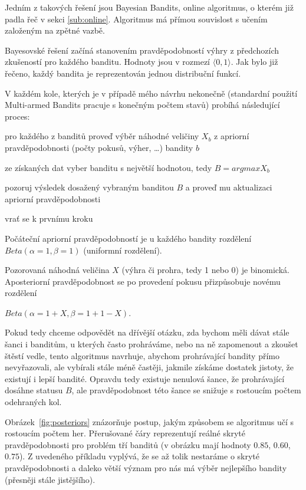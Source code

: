 \documentclass[thesis=M,czech]{FITthesis}[2014/05/07]
\begin{document}
Jedním z takových řešení jsou Bayesian Bandits, online algoritmus, o kterém již padla řeč v sekci \ref{sub:online}. Algoritmus má přímou souvislost s učením založeným na zpětné vazbě.

Bayesovské řešení začíná stanovením pravděpodobností výhry z předchozích zkušeností pro každého banditu. Hodnoty jsou v rozmezí $\langle0,1\rangle$. Jak bylo již řečeno, každý bandita je reprezentován jednou distribuční funkcí.

V každém kole, kterých je v případě mého návrhu nekonečně (standardní použití Multi-armed Bandits pracuje s konečným počtem stavů) probíhá následující proces:

\begin{description}
	\item pro každého z banditů proveď výběr náhodné veličiny $X_b$ z apriorní pravděpodobnosti (počty pokusů, výher, \ldots) bandity $b$
	\item ze získaných dat vyber banditu s největší hodnotou, tedy $B = argmax X_b$	
	\item pozoruj výsledek dosažený vybraným banditou $B$ a proveď mu aktualizaci apriorní pravděpodobnosti	
	\item vrať se k prvnímu kroku
\end{description}

Počáteční apriorní pravděpodobností je u každého bandity rozdělení ${Beta}(\alpha = 1, \beta = 1)$ (uniformní rozdělení).

Pozorovaná náhodná veličina $X$ (výhra či prohra, tedy 1 nebo 0) je binomická. Aposteriorní pravděpodobnost se po provedení pokusu přizpůsobuje novému rozdělení

\begin{center}
${Beta}(\alpha = 1 + X, \beta = 1 + 1 - X)$.
\end{center}

Pokud tedy chceme odpovědět na dřívější otázku, zda bychom měli dávat stále šanci i banditům, u kterých často prohráváme, nebo na ně zapomenout a zkoušet štěstí vedle, tento algoritmus navrhuje, abychom prohrávající bandity přímo nevyřazovali, ale vybírali stále méně častěji, jakmile získáme dostatek jistoty, že existují i lepší bandité. Opravdu tedy existuje nenulová šance, že prohrávající dosáhne statusu $B$, ale pravděpodobnost této šance se snižuje s rostoucím počtem odehraných kol. 


Obrázek~\ref{fig:posteriors} znázorňuje postup, jakým způsobem se algoritmus učí s rostoucím počtem her. Přerušované čáry reprezentují reálné skryté pravděpodobnosti pro problém tří banditů (v obrázku mají hodnoty $0.85$, $0.60$, $0.75$). Z uvedeného příkladu vyplývá, že se až tolik nestaráme o skryté pravděpodobnosti a daleko větší význam pro nás má výběr nejlepšího bandity (přesněji stále jistějšího). 
\end{document}
